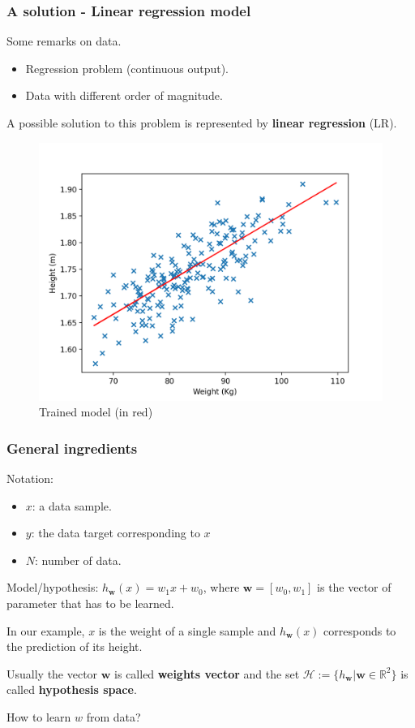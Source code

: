 \documentclass{beamer}
\begin{document}
	\begin{frame}
		\frametitle{A solution - Linear regression model}
		Some remarks on data.
		\begin{itemize}
			\item Regression problem (continuous output).
			\item Data with different order of magnitude.
		\end{itemize}
		A possible solution to this problem is represented by \textbf{linear regression} (LR).
		\begin{figure}
			\centering
			\includegraphics[scale=0.4]{images/linear_regression_fit}
			\caption{Trained model (in red)}
		\end{figure}
	\end{frame}

	\begin{frame}
		\frametitle{General ingredients}
		Notation:
		\begin{itemize}
			\item $x$: a data sample.
			\item $y$: the data target corresponding to $x$
			\item $N$: number of data.
		\end{itemize}
	
		\vspace{5 mm}
		
		Model/hypothesis: $h_{\bm{w}}(x) = w_1x + w_0$, where $\bm{w} = [w_0, w_1]$ is the vector of parameter that has to be learned.
		
		In our example, $x$ is the weight of a single sample and $h_{\bm{w}}(x)$ corresponds to the prediction of its height. 
		
		\vspace{5 mm}
		
		Usually the vector $\bm{w}$ is called \textbf{weights vector} and the set $\mathcal{H}:= \{h_{\bm{w}}| \bm{w} \in \mathbb{R}^2\}$ is called \textbf{hypothesis space}.
		
		\vspace{5 mm}
		
		How to learn $w$ from data?
		
	\end{frame}
\end{document}
